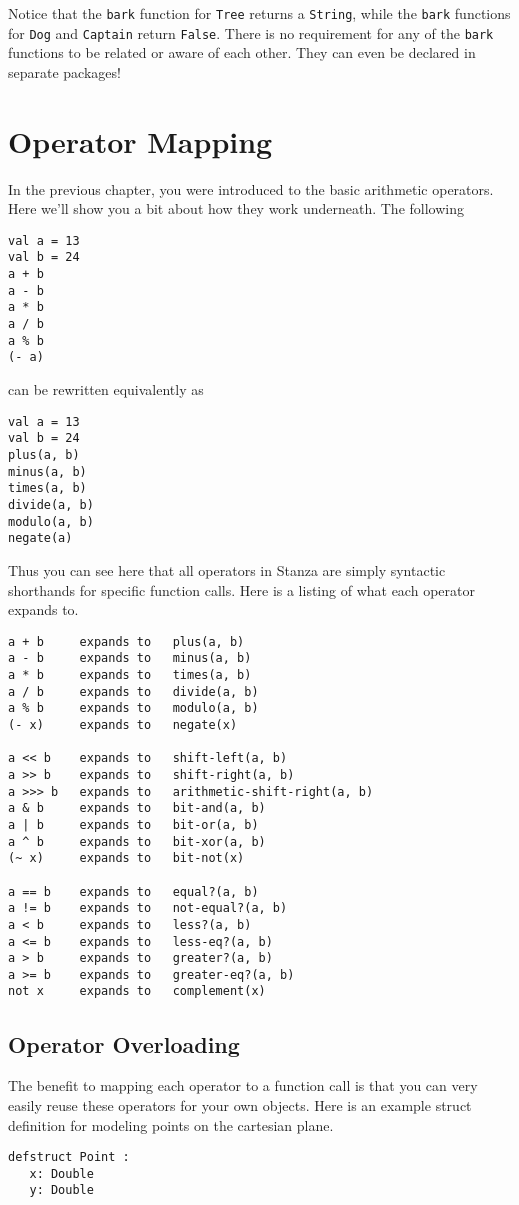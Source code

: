 \documentclass[10pt,oneside]{book}
\begin{document}
Notice that the \texttt{\frenchspacing bark} function for \texttt{\frenchspacing Tree} returns a \texttt{\frenchspacing String}, while the \texttt{\frenchspacing bark} functions for \texttt{\frenchspacing Dog} and \texttt{\frenchspacing Captain} return \texttt{\frenchspacing False}. There is no requirement for any of the \texttt{\frenchspacing bark} functions to be related or aware of each other. They can even be declared in separate packages! 

\section{Operator Mapping}
In the previous chapter, you were introduced to the basic arithmetic operators. Here we'll show you a bit about how they work underneath. The following
\begin{lstlisting}
val a = 13
val b = 24
a + b
a - b
a * b
a / b
a % b
(- a)
\end{lstlisting}
can be rewritten equivalently as
\begin{lstlisting}
val a = 13
val b = 24
plus(a, b)
minus(a, b)
times(a, b)
divide(a, b)
modulo(a, b)
negate(a)
\end{lstlisting}
Thus you can see here that all operators in Stanza are simply syntactic shorthands for specific function calls. Here is a listing of what each operator expands to.
\begin{lstlisting}
a + b     expands to   plus(a, b)
a - b     expands to   minus(a, b)
a * b     expands to   times(a, b)
a / b     expands to   divide(a, b)
a % b     expands to   modulo(a, b)
(- x)     expands to   negate(x)

a << b    expands to   shift-left(a, b)
a >> b    expands to   shift-right(a, b)
a >>> b   expands to   arithmetic-shift-right(a, b)
a & b     expands to   bit-and(a, b)
a | b     expands to   bit-or(a, b)
a ^ b     expands to   bit-xor(a, b)
(~ x)     expands to   bit-not(x)

a == b    expands to   equal?(a, b)
a != b    expands to   not-equal?(a, b)
a < b     expands to   less?(a, b)
a <= b    expands to   less-eq?(a, b)
a > b     expands to   greater?(a, b)
a >= b    expands to   greater-eq?(a, b)
not x     expands to   complement(x)
\end{lstlisting}

\subsection*{Operator Overloading}
The benefit to mapping each operator to a function call is that you can very easily reuse these operators for your own objects. Here is an example struct definition for modeling points on the cartesian plane.
\begin{lstlisting}
defstruct Point :
   x: Double
   y: Double
\end{lstlisting}
\end{document}
